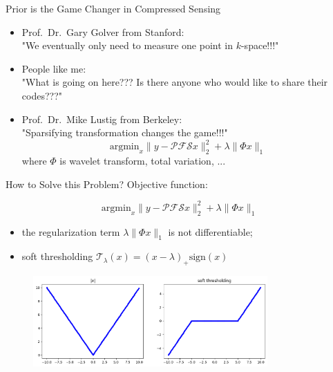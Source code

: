 \begin{frame}{Prior is the Game Changer in Compressed Sensing}
	\begin{itemize}
		\item <1-> Prof.~Dr.~Gary Golver from Stanford:\\
		"We eventually only need to measure one point in $k$-space!!!"
		\vspace{1em}
		\item <2->People like me:\\
		"What is going on here??? Is there anyone who would like to share their codes???"
		\vspace{1em}
		\item <3-> Prof.~Dr.~Mike Lustig from Berkeley:\\
		"Sparsifying transformation changes the game!!!"
		\begin{equation}
			\mathrm{argmin}_x \lVert y -  \mathcal{P} \mathcal{F} \mathcal{S} x \rVert_2^2 + \lambda \lVert \Phi x \rVert_1
		\end{equation}
		where $\Phi$ is wavelet transform, total variation, ...
	\end{itemize}
	
	
\end{frame}


\begin{frame}{How to Solve this Problem?}
	Objective function:

	\begin{equation}
		\mathrm{argmin}_x \lVert y -  \mathcal{P} \mathcal{F} \mathcal{S} x \rVert_2^2 + \lambda \lVert \Phi x \rVert_1
	\end{equation}

	\begin{itemize}
		\item the regularization term $\lambda \lVert \Phi x \rVert_1$ is not differentiable;
		\item soft thresholding $\mathcal{T}_\lambda(x) = (x - \lambda)_+ \mathrm{sign}(x)$
	\end{itemize}

	\begin{figure}
		\centering
		\includegraphics[width=0.8\textwidth]{fig/soft_thresh.png}
	\end{figure}

\end{frame}


